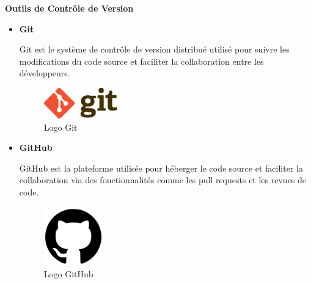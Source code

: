 \textbf{Outils de Contrôle de Version}
\begin{itemize}
  \item \textbf{Git}

    Git est le système de contrôle de version distribué utilisé pour suivre
    les modifications du code source et faciliter la collaboration entre les
    développeurs.

    \begin{figure}[H]
      \centering
      \includegraphics[width=0.3\textwidth]{images/Git-logo.svg.png}
      \caption{Logo Git}
    \end{figure}

  \item \textbf{GitHub}

    GitHub est la plateforme utilisée pour héberger le code source et faciliter
    la collaboration via des fonctionnalités comme les pull requests et les
    revues de code.

    \begin{figure}[H]
      \centering
      \includegraphics[width=1.0in, height=1.0in]{images/GitHub_Invertocat_Logo.svg.png}
      \caption{Logo GitHub}
    \end{figure}
\end{itemize}

